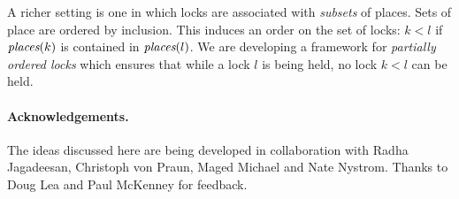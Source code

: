 \documentclass[twocolumn]{article}
\def\places{\mbox{\em places}}
\begin{document}
A richer setting is one in which locks are associated with {\em
subsets} of places. Sets of place are ordered by inclusion. This
induces an order on the set of locks: $k < l$ if $\places(k)$ is
contained in $\places(l)$. We are developing a framework for {\em
partially ordered locks} which ensures that while a lock $l$ is being
held, no lock $k < l$ can be held.

\paragraph{Acknowledgements.} 
The ideas discussed here are being developed in collaboration with
Radha Jagadeesan, Christoph von Praun, Maged Michael and Nate Nystrom. 
Thanks to Doug Lea and Paul McKenney for feedback.

 

\end{document}
